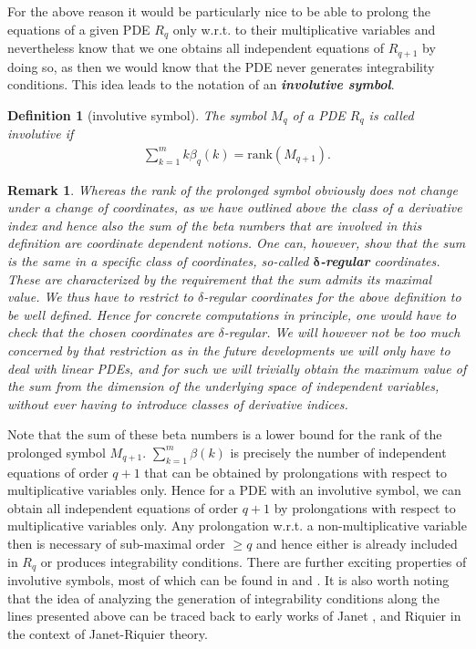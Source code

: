 \documentclass[a4paper,12pt, DIV=14, BCOR=5mm, twoside, headsepline, numbers=noenddot]{scrbook}
\newtheorem{definition}{Definition}[section]
\newtheorem*{remark}{Remark}
\begin{document}
For the above reason it would be particularly nice to be able to prolong the equations of a given PDE $R_q$ only w.r.t. to their multiplicative variables and nevertheless know that we one obtains all independent equations of $R_{q+1}$ by doing so, as then we would know that the PDE never generates integrability conditions. This idea leads to the notation of an \textit{\textbf{involutive symbol}}. 
\begin{definition}[involutive symbol]
The symbol $M_q$ of a PDE $R_q$ is called involutive if 
\begin{align}\label{sumBeta}
    \sum_{k=1}^m k\beta_q(k) = \mathrm{rank}(M_{q+1}).
\end{align}
\end{definition}
\begin{remark}
Whereas the rank of the prolonged symbol obviously does not change under a change of coordinates,
as we have outlined above the class of a derivative index and hence also the sum of the beta numbers that are involved in this definition are coordinate dependent notions. One can, however, show that the sum is the same in a specific class of coordinates, so-called \textit{\textbf{$\boldsymbol{\delta}$-regular}} coordinates. These are characterized by the requirement that the sum admits its maximal value.
We thus have to restrict to $\delta$-regular coordinates for the above definition to be well defined.
Hence for concrete computations in principle, one would have to check that the chosen coordinates are $\delta$-regular.  We will however not be too much concerned by that restriction as in the future developments we will only have to deal with linear PDEs, and for such we will trivially obtain the maximum value of the sum from the dimension of the underlying space of independent variables, without ever having to introduce classes of derivative indices.
\end{remark}
Note that the sum of these beta numbers is a lower bound for the rank of the prolonged symbol $M_{q+1}$. $\sum_{k=1}^m \beta(k)$ is precisely the number of independent equations of order $q+1$ that can be obtained by prolongations with respect to multiplicative variables only.  
Hence for a PDE with an involutive symbol, we can obtain all independent equations of order $q+1$ by prolongations with respect to multiplicative variables only. Any prolongation w.r.t. a non-multiplicative variable then is necessary of sub-maximal order $\geq q$ and hence either is already included in $R_q$ or produces integrability conditions. There are further exciting properties of involutive symbols, most of which can be found in \cite{seiler2009involution} and \cite{seiler2009involution}. It is also worth noting that the idea of analyzing the generation of integrability conditions along the lines presented above can be traced back to early works of Janet \cite{janet1920systemes}, \cite{MSM_1927__21__1_0} and Riquier \cite{bateman_1910} in the context of Janet-Riquier theory.
\end{document}

